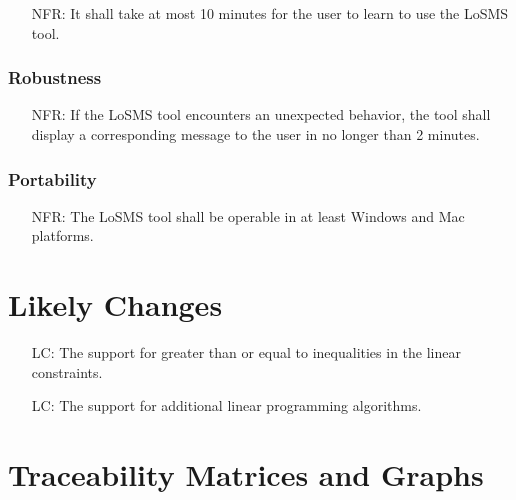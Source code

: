 \documentclass[12pt]{article}
\newcounter{reqnum} %
\newcounter{nfreqnum} %
\newcounter{lcnum} %
\newcommand{\famname}{LoSMS} %
\begin{document}
\noindent 
\begin{itemize}
	\item[NFR\refstepcounter{nfreqnum}\thenfreqnum \label{usability}:] It shall 
	take at most 10 minutes for the user to learn to use the \famname{} tool.
\end{itemize}

\subsubsection*{Robustness}

\begin{itemize}
	\item[NFR\refstepcounter{nfreqnum}\thenfreqnum \label{robustness}:] If the 
	\famname{} tool encounters an unexpected behavior, the tool shall display 
	a corresponding message to the user in no longer than 2 minutes.
\end{itemize}

\subsubsection*{Portability}

\begin{itemize}
	\item[NFR\refstepcounter{nfreqnum}\thenfreqnum \label{portability}:] The 
	\famname{} tool shall be operable in at least Windows and Mac platforms.
\end{itemize}

\section{Likely Changes} \label{Sec_LikelyChanges} 

\noindent 
\begin{itemize}
	\item[LC\refstepcounter{lcnum}\thelcnum\label{LC_inequalities}:] The 
	support for greater than or equal to inequalities in the linear constraints.
	
	\item[LC\refstepcounter{lcnum}\thelcnum\label{LC_moreAlgorithms}:] The 
	support for additional linear programming algorithms.
\end{itemize}

\section{Traceability Matrices and Graphs} \label{Sec_TraceabilityMatrix}
\end{document}
